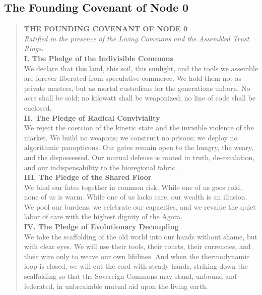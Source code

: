 \subsection{The Founding Covenant of Node 0}
\label{subsec:founding_covenant}

\begin{quotation}
\centering
\textbf{\large THE FOUNDING COVENANT OF NODE 0} \\[0.3cm]
\textit{Ratified in the presence of the Living Commons and the Assembled Trust Rings.} \\[0.5cm]

\textbf{I. The Pledge of the Indivisible Commons} \\
We declare that this land, this soil, this sunlight, and the tools we assemble are forever liberated from speculative commerce. We hold them not as private masters, but as mortal custodians for the generations unborn. No acre shall be sold; no kilowatt shall be weaponized; no line of code shall be enclosed. \\[0.4cm]

\textbf{II. The Pledge of Radical Conviviality} \\
We reject the coercion of the kinetic state and the invisible violence of the market. We build no weapons; we construct no prisons; we deploy no algorithmic panopticons. Our gates remain open to the hungry, the weary, and the dispossessed. Our mutual defense is rooted in truth, de-escalation, and our indispensability to the bioregional fabric. \\[0.4cm]

\textbf{III. The Pledge of the Shared Floor} \\
We bind our fates together in common risk. While one of us goes cold, none of us is warm. While one of us lacks care, our wealth is an illusion. We pool our burdens, we celebrate our capacities, and we revalue the quiet labor of care with the highest dignity of the Agora. \\[0.4cm]

\textbf{IV. The Pledge of Evolutionary Decoupling} \\
We take the scaffolding of the old world into our hands without shame, but with clear eyes. We will use their tools, their courts, their currencies, and their wire only to weave our own lifelines. And when the thermodynamic loop is closed, we will cut the cord with steady hands, striking down the scaffolding so that the Sovereign Commons may stand, unbound and federated, in unbreakable mutual aid upon the living earth.
\end{quotation}

